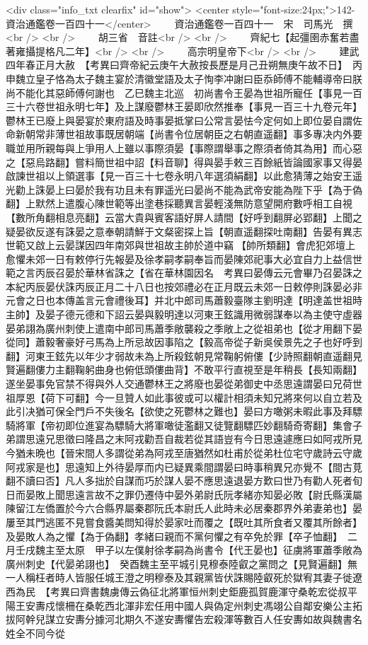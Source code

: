 <div class="info_txt clearfix" id="show">
<center style="font-size:24px;">142-資治通鑑卷一百四十一</center>
  　　資治通鑑卷一百四十一　宋　司馬光　撰<br />
<br />
　　胡三省　音註<br />
<br />
　　齊紀七【起彊圉赤奮若盡著雍攝提格凡二年】<br />
<br />
　　高宗明皇帝下<br />
<br />
　　建武四年春正月大赦　【考異曰齊帝紀云庚午大赦按長歷是月己丑朔無庚午故不日】　丙申魏立皇子恪為太子魏主宴於清徽堂語及太子恂李冲謝曰臣忝師傅不能輔導帝曰朕尚不能化其惡師傅何謝也　乙巳魏主北巡　初尚書令王晏為世祖所寵任【事見一百三十六卷世祖永明七年】及上謀廢鬱林王晏即欣然推奉【事見一百三十九卷元年】鬱林王已廢上與晏宴於東府語及時事晏抵掌曰公常言晏怯今定何如上即位晏自謂佐命新朝常非薄世祖故事既居朝端【尚書令位居朝臣之右朝直遥翻】事多專决内外要職並用所親每與上爭用人上雖以事際須晏【事際謂舉事之際須者倚其為用】而心惡之【惡烏路翻】嘗料簡世祖中詔【料音聊】得與晏手敕三百餘紙皆論國家事又得晏啟諫世祖以上領選事【見一百三十七卷永明八年選須絹翻】以此愈猜薄之始安王遥光勸上誅晏上曰晏於我有功且未有罪遥光曰晏尚不能為武帝安能為陛下乎【為于偽翻】上默然上遣腹心陳世範等出塗巷採聽異言晏輕淺無防意望開府數呼相工自視【數所角翻相息亮翻】云當大貴與賓客語好屏人請間【好呼到翻屏必郢翻】上聞之疑晏欲反遂有誅晏之意奉朝請鮮于文粲密探上旨【朝直遥翻探吐南翻】告晏有異志世範又啟上云晏謀因四年南郊與世祖故主帥於道中竊【帥所類翻】會虎犯郊壇上愈懼未郊一日有敕停行先報晏及徐孝嗣孝嗣奉旨而晏陳郊祀事大必宜自力上益信世範之言丙辰召晏於華林省誅之【省在華林園因名　考異曰晏傳云元會畢乃召晏誅之本紀丙辰晏伏誅丙辰正月二十八日也按郊禮必在正月既云未郊一日敕停則誅晏必非元會之日也本傳盖言元會禮後耳】并北中郎司馬蕭毅臺隊主劉明達【明達盖世祖時主帥】及晏子德元德和下詔云晏與毅明達以河東王鉉識用微弱謀奉以為主使守虛器晏弟詡為廣州刺使上遣南中郎司馬蕭季敞襲殺之季敞上之從祖弟也【從才用翻下晏從同】蕭毅奢豪好弓馬為上所忌故因事陷之【毅高帝從子新吳侯景先之子也好呼到翻】河東王鉉先以年少才弱故未為上所殺鉉朝見常鞠躬俯僂【少詩照翻朝直遥翻見賢遍翻僂力主翻鞠躬曲身也俯低頭僂曲背】不敢平行直視至是年稍長【長知兩翻】遂坐晏事免官禁不得與外人交通鬱林王之將廢也晏從弟御史中丞思遠謂晏曰兄荷世祖厚恩【荷下可翻】今一旦贊人如此事彼或可以權計相須未知兄將來何以自立若及此引决猶可保全門戶不失後名【欲使之死鬱林之難也】晏曰方噉粥未暇此事及拜驃騎將軍【帝初即位進宴為驃騎大將軍噉徒濫翻又徒覽翻驃匹妙翻騎奇寄翻】集會子弟謂思遠兄思徵曰隆昌之末阿戎勸吾自裁若從其語豈有今日思遠遽應曰如阿戎所見今猶未晩也【晉宋間人多謂從弟為阿戎至唐猶然如杜甫於從弟杜位宅守歲詩云守歲阿戎家是也】思遠知上外待晏厚而内已疑異乘間謂晏曰時事稍異兄亦覺不【間古莧翻不讀曰否】凡人多拙於自謀而巧於謀人晏不應思遠退晏方歎曰世乃有勸人死者旬日而晏敗上聞思遠言故不之罪仍遷侍中晏外弟尉氏阮孝緒亦知晏必敗【尉氏縣漢屬陳留江左僑置於今六合縣界屬秦郡阮氏本尉氏人此時未必居秦郡界外弟妻弟也】晏屢至其門逃匿不見嘗食醬美問知得於晏家吐而覆之【既吐其所食者又覆其所餘者】及晏敗人為之懼【為于偽翻】孝緒曰親而不黨何懼之有卒免於罪【卒子恤翻】　二月壬戌魏主至太原　甲子以左僕射徐孝嗣為尚書令【代王晏也】征虜將軍蕭季敞為廣州刺史【代晏弟詡也】　癸酉魏主至平城引見穆泰陸叡之黨問之【見賢遍翻】無一人稱枉者時人皆服任城王澄之明穆泰及其親黨皆伏誅賜陸叡死於獄宥其妻子徙遼西為民　【考異曰齊書魏虜傳云偽征北將軍恒州刺史鉅鹿孤賀鹿渾守桑乾宏從叔平陽王安夀戍懷柵在桑乾西北渾非宏任用中國人與偽定州刺史馮翊公自鄰安樂公主拓拔阿幹兒謀立安夀分據河北期久不遂安夀懼告宏殺渾等數百人任安夀如故與魏書名姓全不同今從